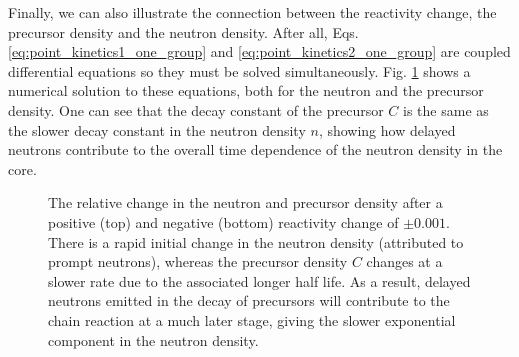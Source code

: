Finally, we can also illustrate the connection between the reactivity change, the precursor density and the neutron density. After all, Eqs. \ref{eq:point_kinetics1_one_group} and \ref{eq:point_kinetics2_one_group} are coupled differential equations so they must be solved simultaneously. Fig. \ref{fig:kinetics_solution_0001} shows a numerical solution to these equations, both for the neutron and the precursor density. One can see that the decay constant of the precursor $C$ is the same as the slower decay constant in the neutron density $n$, showing how delayed neutrons contribute to the overall time dependence of the neutron density in the core.
\begin{figure}[ht!]
\protect {}\protect
\caption{\label{fig:kinetics_solution_0001} \footnotesize{The relative change in the neutron and precursor density after a positive (top) and negative (bottom) reactivity change of $\pm0.001$. There is a rapid initial change in the neutron density (attributed to prompt neutrons), whereas the precursor density $C$ changes at a slower rate due to the associated longer half life. As a result, delayed neutrons emitted in the decay of precursors will contribute to the chain reaction at a much later stage, giving the slower exponential component in the neutron density.}}
\end{figure}

